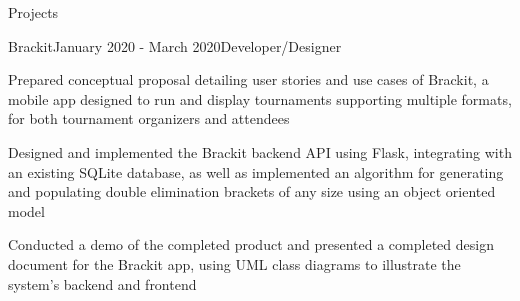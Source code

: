\documentclass{resume} %
\begin{document}
\begin{rSection}{Projects}

\begin{rSubsection}{Brackit}{January 2020 - March 2020}{Developer/Designer}{}
\item Prepared conceptual proposal detailing user stories and use cases of Brackit, a mobile app designed to run and display tournaments supporting multiple formats, for both tournament organizers and attendees
\item Designed and implemented the Brackit backend API using Flask, integrating with an existing SQLite database, as well as implemented an algorithm for generating and populating double elimination brackets of any size using an object oriented model
\item Conducted a demo of the completed product and presented a completed design document for the Brackit app, using UML class diagrams to illustrate the system’s backend and frontend
\end{rSubsection}

\end{rSection}





\end{document}
